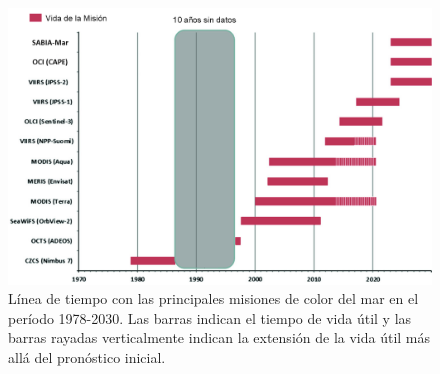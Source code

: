     \begin{figure}
    \centering
    \includegraphics[width=\textwidth]{int/figures/sensor_timelines.png}
    \caption[Línea de tiempo con las principales misiones de color del mar en el período 1978-2030.]{Línea de tiempo con las principales misiones de color del mar en el período 1978-2030. Las barras indican el tiempo de vida útil y las barras rayadas verticalmente indican la extensión de la vida útil más allá del pronóstico inicial.}
    \label{int:sensor_timelines}
    \end{figure}

